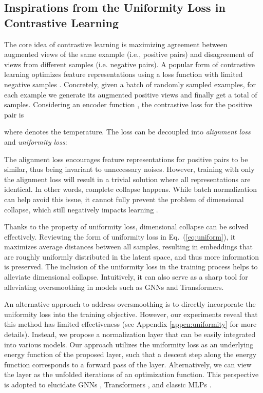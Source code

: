 \documentclass{article}
\theoremstyle{definition}
\theoremstyle{remark}
\theoremstyle{theorem}
\begin{document}
\subsection{Inspirations from the Uniformity Loss in Contrastive Learning}

The core idea of contrastive learning is maximizing agreement between augmented views of the same example (i.e., positive pairs) and disagreement of views from different samples (i.e. negative pairs). A popular form of contrastive learning optimizes feature representations using a loss function with limited negative samples \citep{chen2020simple}. Concretely, given a batch of randomly sampled examples, for each example we generate its augmented positive views and finally get a total of  samples. Considering an encoder function , the contrastive loss for the positive pair  is 

where  denotes the temperature. The loss can be decoupled into \textit{alignment loss} and \textit{uniformity loss}:

The alignment loss encourages feature representations for positive pairs to be similar, thus being invariant to unnecessary noises. However, training with only the alignment loss will result in a trivial solution where all representations are identical. In other words, complete collapse happens. While batch normalization \citep{ioffe2015batch} can help avoid this issue, it cannot fully prevent the problem of dimensional collapse, which still negatively impacts learning \citep{hua2021feature}. 

Thanks to the property of uniformity loss, dimensional collapse can be solved effectively. Reviewing the form of uniformity loss in Eq.~(\ref{eq:uniform}), it maximizes average distances between all samples, resulting in embeddings that are roughly uniformly distributed in the latent space, and thus more information is preserved. The inclusion of the uniformity loss in the training process helps to alleviate dimensional collapse. Intuitively, it can also serve as a sharp tool for alleviating oversmoothing in models such as GNNs and Transformers. 

An alternative approach to address oversmoothing is to directly incorporate the uniformity loss into the training objective. However, our experiments reveal that this method has limited effectiveness (see Appendix \ref{appen:uniformity} for more details). Instead, we propose a normalization layer that can be easily integrated into various models. Our approach utilizes the uniformity loss as an underlying energy function of the proposed layer, such that a descent step along the energy function corresponds to a forward pass of the layer. Alternatively, we can view the layer as the unfolded iterations of an optimization function. This perspective is adopted to elucidate GNNs \citep{yang2021graph, zhu2021interpreting}, Transformers \citep{yang2022transformers}, and classic MLPs \citep{xie2021optimization}. 
\end{document}
